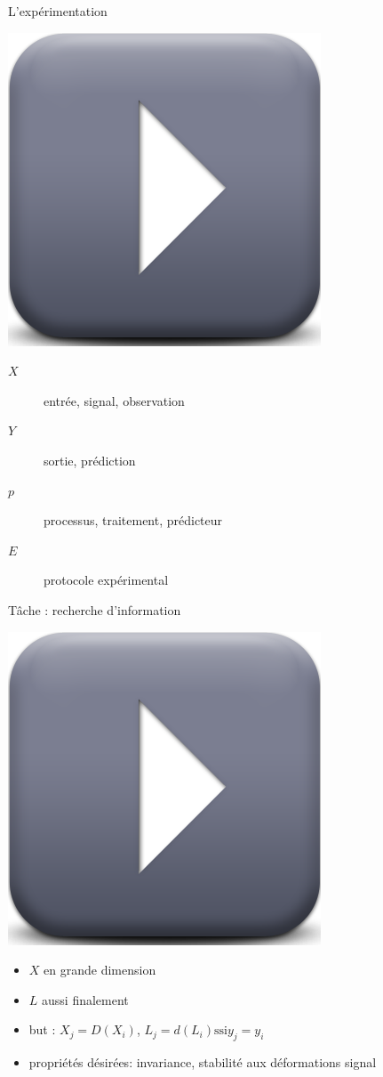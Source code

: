 \begin{frame}{L'expérimentation}
\begin{center}
\includegraphics[width=.3\columnwidth]{figures/play} \\
\end{center}
\begin{description}
\item[$X$] entrée, signal, observation
\item[$Y$] sortie, prédiction
\item[$p$] processus, traitement, prédicteur
\item[$E$] protocole expérimental
\end{description}
\end{frame}

\begin{frame}{\alert{Tâche} : recherche d'information}
\begin{center}
\includegraphics[width=.3\columnwidth]{figures/play}
\end{center}
\begin{itemize}
\item $X$ en grande dimension
\item $L$ aussi finalement
\item but : $X_j=D(X_i)$, $L_j=d(L_i) \text{ssi} y_j=y_i$
\item propriétés désirées: invariance, stabilité aux déformations signal
\end{itemize}
\end{frame}

